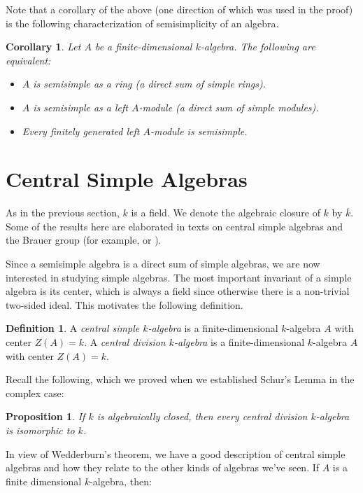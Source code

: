 \documentclass[12pt]{article}
\theoremstyle{plain}
\newtheorem{proposition}[theorem]{Proposition}
\newtheorem{corollary}[theorem]{Corollary}
\theoremstyle{definition}
\newtheorem{definition}[theorem]{Definition}
\theoremstyle{remark}
\numberwithin{equation}{section}
\begin{document}
Note that a corollary of the above (one direction of which was used in
the proof) is the following characterization of semisimplicity of an
algebra.

\begin{corollary}
Let $A$ be a finite-dimensional $k$-algebra.
The following are equivalent:
\begin{itemize}
\item $A$ is semisimple as a ring (a direct sum of simple rings).
\item $A$ is semisimple as a left $A$-module (a direct sum of simple
modules).
\item Every finitely generated left $A$-module is semisimple.
\end{itemize}
\end{corollary}

\section{Central Simple Algebras}

As in the previous section, $k$ is a field.
We denote the algebraic closure of $k$ by $\overline{k}$.
Some of the results here are elaborated in texts on central simple
algebras and the Brauer group (for example, \cite{GS} or \cite{Saltman}). 

Since a semisimple algebra is a direct sum of simple algebras,
we are now interested in studying simple algebras.
The most important invariant of a simple algebra is its center,
which is always a field since otherwise there is a non-trivial two-sided
ideal.  This motivates the following definition.

\begin{definition}
A \emph{central simple $k$-algebra} is a finite-dimensional $k$-algebra
$A$ with center $Z(A)=k$.
A \emph{central division $k$-algebra} is a finite-dimensional $k$-algebra
$A$ with center $Z(A)=k$.
\end{definition}

Recall the following, which we proved when we established Schur's Lemma
in the complex case:

\begin{proposition} \label{prop:division_ac}
If $k$ is algebraically closed, then every central division $k$-algebra
is isomorphic to $k$.
\end{proposition}

In view of Wedderburn's theorem, we have a good description of central
simple algebras and how they relate to the other kinds of
algebras we've seen.  If $A$ is a finite dimensional $k$-algebra,
then:
\end{document}
